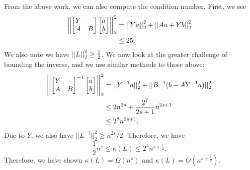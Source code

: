 From the above work, we can also compute the condition number.
First, we see
%
\begin{align}
    \left| \left| \begin{bmatrix}Y&\\A&B\end{bmatrix}
            \begin{bmatrix}a\\b\end{bmatrix} \right| \right|_{2}^{2}
    &= \left| \left| Ya \right| \right|_{2}^{2} + \left| \left| Aa + Yb \right| \right|_{2}^{2} \nonumber\\
    &\le 25.
\end{align}
%
We also note we have $\left| \left| L \right| \right|_{2}^{2}\ge\frac{1}{2}$.
We now look at the greater challenge of bounding the inverse,
and we use similar methods to those above:
%
\begin{align}
    \left| \left| \begin{bmatrix}Y&\\A&B\end{bmatrix}^{-1}
            \begin{bmatrix}a\\b\end{bmatrix} \right| \right|_{2}^{2}
    &= ||Y^{-1}a||_{2}^{2} + ||B^{-1}(b - AY^{-1}a)||_{2}^{2} \nonumber\\
    &\le 2n^{2s} + \frac{2^{7}}{2s+1}n^{2s+1} \nonumber\\
    &\le 2^{8}n^{2s+1}.
\end{align}
%
Due to $Y$, we also have $||L^{-1}||_{2}^{2}\ge n^{2s}/2$.
Therefore, we have
%
\begin{equation}
    \frac{1}{2}n^{s} \le \kappa(L) \le 2^{4}n^{s+\frac{1}{2}}.
\end{equation}
%
Therefore, we have shown $\kappa(L) = \Omega(n^{s})$ and
$\kappa(L) = O(n^{s+\frac{1}{2}})$.



